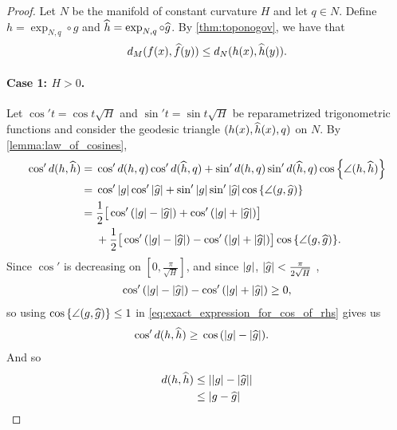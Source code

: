\documentclass[english, a4paper, 12pt]{article}
\begin{document}
\begin{proof}
	Let $N$ be the manifold of constant curvature $H$ and let $q \in N$.
	Define $h = \operatorname{exp}_{N, q} \circ g$ and $\widehat{h} = \operatorname{exp}_{N, q} \circ \widehat{g}$.
	By \cref{thm:toponogov}, we have that
	\begin{align}
		d_M(f(x), \widehat{f}(y)) \leq d_N(h(x), \widehat{h}(y)).
	\end{align}

	\paragraph{Case 1: $H > 0$.}
	Let $\cos'{t} = \cos{t \sqrt{H}}$ and $\sin'{t} = \sin{t \sqrt{H}}$ be reparametrized trigonometric functions and consider the geodesic triangle $(h(x), \widehat{h}(x), q)$ on $N$.
	By \cref{lemma:law_of_cosines},
	\begin{align}
		\cos'{d(h, \mathhat{h})} ={}&
			\cos'{d(h, q)} \cos'{d(\mathhat{h}, q)}
			+ \sin'{d(h, q)} \sin'{d(\mathhat{h}, q)} \cos{\left\{ \angle(h, \mathhat{h}) \right\}}\\
		={}&
			\cos'{\abs{g}} \cos'{\abs{\mathhat{g}}}
			+ \sin'{\abs{g}} \sin'{\abs{\mathhat{g}}} \cos{\left\{ \angle(g, \mathhat{g}) \right\}}\\
		={}& \frac{1}{2} \big[
			\cos'{(\abs{g} - \abs{\mathhat{g}})}
			+ \cos'{(\abs{g} + \abs{\mathhat{g}})}
		\big]\\
		&+ \frac{1}{2} \big[
			\cos'{(\abs{g} - \abs{\mathhat{g}})}
			- \cos'{(\abs{g} + \abs{\mathhat{g}})}
		\big] \cos{\left\{ \angle(g, \mathhat{g}) \right\}}.%
		\label{eq:exact_expression_for_cos_of_rhs}
	\end{align}
	Since $\cos'{}$ is decreasing on $[0, \frac{\pi}{\sqrt{H}}]$, and since $\abs{g}$, $\abs{\widehat{g}} < \frac{\pi}{2 \sqrt{H}}$ ,
	\begin{align}
		\cos'{(\abs{g} - \abs{\widehat{g}})}
		- \cos'{(\abs{g} + \abs{\widehat{g}})} \geq 0,
	\end{align}
	so using $\cos{\left\{ \angle(g, \widehat{g}) \right\}} \leq 1$ in \cref{eq:exact_expression_for_cos_of_rhs} gives us
	\begin{align}
		\cos'{d(h, \widehat{h})} \geq{}& \cos{(\abs{g} - \abs{\widehat{g}})}.
	\end{align}
	And so
	\begin{align}
		d(h, \widehat{h}) \leq{}& \abs{\abs{g} - \abs{\widehat{g}}}\\
		\leq{}& \abs{g - \widehat{g}}
	\end{align}
	

\end{proof}
\end{document}
